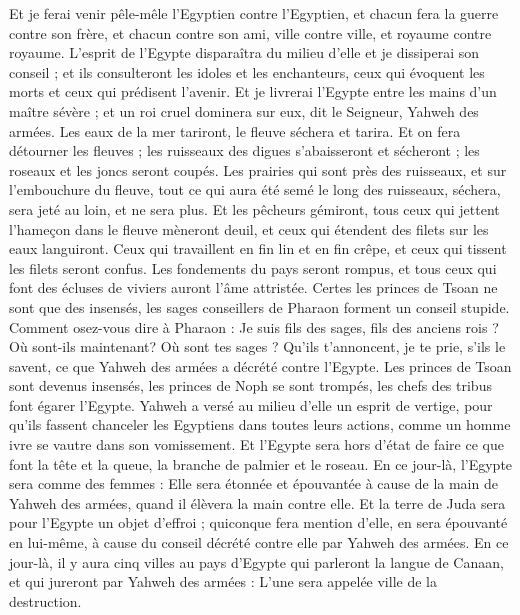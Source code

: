 \begin{multicols}{2}
Et je ferai venir pêle-mêle l'Egyptien contre l'Egyptien, et chacun fera la guerre contre son frère, et chacun contre son ami, ville contre ville, et royaume contre royaume.
L'esprit de l'Egypte disparaîtra du milieu d'elle et je dissiperai son conseil ; et ils consulteront les idoles et les enchanteurs, ceux qui évoquent les morts et ceux qui prédisent l'avenir.
Et je livrerai l'Egypte entre les mains d'un maître sévère ; et un roi cruel dominera sur eux, dit le Seigneur, Yahweh des armées.
Les eaux de la mer tariront, le fleuve séchera et tarira.
Et on fera détourner les fleuves ; les ruisseaux des digues s'abaisseront et sécheront ; les roseaux et les joncs seront coupés.
Les prairies qui sont près des ruisseaux, et sur l'embouchure du fleuve, tout ce qui aura été semé le long des ruisseaux, séchera, sera jeté au loin, et ne sera plus.
Et les pêcheurs gémiront, tous ceux qui jettent l'hameçon dans le fleuve mèneront deuil, et ceux qui étendent des filets sur les eaux languiront.
Ceux qui travaillent en fin lin et en fin crêpe, et ceux qui tissent les filets seront confus.
Les fondements du pays seront rompus, et tous ceux qui font des écluses de viviers auront l'âme attristée.
Certes les princes de Tsoan ne sont que des insensés, les sages conseillers de Pharaon forment un conseil stupide. Comment osez-vous dire à Pharaon : Je suis fils des sages, fils des anciens rois ?
Où sont-ils maintenant? Où sont tes sages ? Qu'ils t'annoncent, je te prie, s'ils le savent, ce que Yahweh des armées a décrété contre l'Egypte.
Les princes de Tsoan sont devenus insensés, les princes de Noph se sont trompés, les chefs des tribus font égarer l'Egypte.
Yahweh a versé au milieu d'elle un esprit de vertige, pour qu'ils fassent chanceler les Egyptiens dans toutes leurs actions, comme un homme ivre se vautre dans son vomissement.
Et l'Egypte sera hors d'état de faire ce que font la tête et la queue, la branche de palmier et le roseau.
En ce jour-là, l'Egypte sera comme des femmes : Elle sera étonnée et épouvantée à cause de la main de Yahweh des armées, quand il élèvera la main contre elle.
Et la terre de Juda sera pour l'Egypte un objet d'effroi ; quiconque fera mention d'elle, en sera épouvanté en lui-même, à cause du conseil décrété contre elle par Yahweh des armées.
En ce jour-là, il y aura cinq villes au pays d'Egypte qui parleront la langue de Canaan, et qui jureront par Yahweh des armées : L'une sera appelée ville de la destruction.

\end{multicols}

